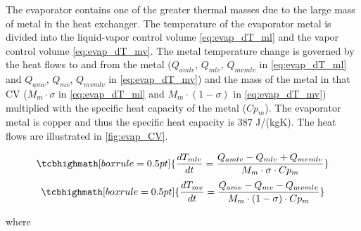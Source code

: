 The evaporator contains one of the greater thermal masses due to the large mass of metal in the heat exchanger. The temperature of the evaporator metal is divided into the liquid-vapor control volume \cref{eq:evap_dT_ml} and the vapor control volume \cref{eq:evap_dT_mv}. The metal temperature change is governed by the heat flows to and from the metal ($Q_{amlv}$, $Q_{mlv}$, $Q_{mvmlv}$ in \cref{eq:evap_dT_ml} and $Q_{amv}$, $Q_{mv}$, $Q_{mvmlv}$ in \cref{eq:evap_dT_mv}) and the mass of the metal in that CV ($M_m \cdot \sigma$ in \cref{eq:evap_dT_ml} and $M_m \cdot (1 - \sigma)$ in \cref{eq:evap_dT_mv}) multiplied with the specific heat capacity of the metal ($Cp_m$). The evaporator metal is copper and thus the specific heat capacity is $387$ \si{J}/(\si{kg}\si{K}). The heat flows are illustrated in \cref{fig:evap_CV}.


\begin{equation}
	\tcbhighmath[boxrule = 0.5pt]{ 	\frac{dT_{mlv}}{dt}  = \frac{Q_{amlv}-Q_{mlv} + Q_{mvmlv}}{M_m \cdot \sigma \cdot Cp_m}  }    \label{eq:evap_dT_ml}
\end{equation}
\begin{equation}
	\tcbhighmath[boxrule = 0.5pt]{ \frac{dT_{mv}}{dt} = \frac{Q_{amv} - Q_{mv} - Q_{mvmlv}}{M_m \cdot (1 - \sigma) \cdot Cp_m } }     \label{eq:evap_dT_mv}
\end{equation}



where

